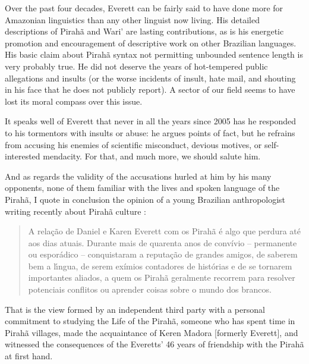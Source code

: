 \documentclass[output=paper,colorlinks,citecolor=brown
]{langscibook}
\begin{document}
Over the past four decades, Everett can be fairly said to have done
more for Amazonian linguistics than any other linguist now living.
His detailed descriptions of Pirahã and Wari' are lasting
contributions, as is his energetic promotion and encouragement of
descriptive work on other Brazilian languages. His basic claim about
Pirahã syntax not permitting unbounded sentence length is very
probably true. He did not deserve the years of hot-tempered public
allegations and insults (or the worse incidents of insult, hate mail,
and shouting in his face that he does not publicly report). A sector
of our field seems to have lost its moral compass over this issue.

It speaks well of Everett that never in all the years since 2005 has
he responded to his tormentors with insults or abuse: he argues points
of fact, but he refrains from accusing his enemies of scientific
misconduct, devious motives, or self-interested mendacity. For that,
and much more, we should salute him.

And as regards the validity of the accusations hurled at him by his
many opponents, none of them familiar with the lives and spoken
language of the Pirahã, I quote in conclusion the opinion of a
young Brazilian anthropologist writing recently about Pirahã
culture \citep[59]{Felizes23}:
\begin{quote}
A rela{\c{c}}{ã}o de Daniel e Karen Everett com os Pirahã {\'e}
algo que perdura at{\'e} aos dias atuais. Durante mais de quarenta
anos de convívio – permanente ou espor{\'a}dico – conquistaram a
reputa{\c{c}}{ã}o de grandes amigos, de saberem bem a l{\'\i}ngua, de
serem exímios contadores de histórias e de se tornarem importantes
aliados, a quem os Pirahã geralmente recorrem para resolver
potenciais conflitos ou aprender coisas sobre o mundo dos brancos.

\end{quote}
That is the view formed by an independent third party with a personal
commitment to studying the Life of the Pirahã, someone who has spent time
in Pirahã villages, made the acquaintance of Keren Madora [formerly
Everett], and witnessed the consequences of the Everetts' 46 years of
friendship with the Pirahã at first hand.
\end{document}
